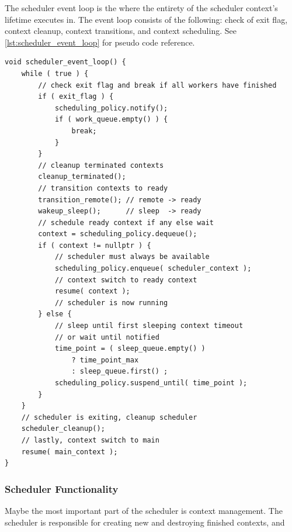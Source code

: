 The scheduler event loop is the where the entirety of the scheduler context's lifetime executes in. The event loop consists of the following: check of exit flag, context cleanup, context transitions, and context scheduling. See \cref{lst:scheduler_event_loop} for pseudo code reference.

\begin{lstfloat}
\begin{lstlisting}[caption={Scheduler event loop pseudo code.}, label={lst:scheduler_event_loop}, style={CustomC}, xleftmargin={4em}]
void scheduler_event_loop() {
    while ( true ) {
        // check exit flag and break if all workers have finished
        if ( exit_flag ) {
            scheduling_policy.notify();
            if ( work_queue.empty() ) {
                break;
            }
        }
        // cleanup terminated contexts
        cleanup_terminated();
        // transition contexts to ready
        transition_remote(); // remote -> ready
        wakeup_sleep();      // sleep  -> ready
        // schedule ready context if any else wait
        context = scheduling_policy.dequeue();
        if ( context != nullptr ) {
            // scheduler must always be available
            scheduling_policy.enqueue( scheduler_context );
            // context switch to ready context
            resume( context );
            // scheduler is now running
        } else {
            // sleep until first sleeping context timeout
            // or wait until notified
            time_point = ( sleep_queue.empty() )
                ? time_point_max
                : sleep_queue.first() ;
            scheduling_policy.suspend_until( time_point );
        }
    }
    // scheduler is exiting, cleanup scheduler
    scheduler_cleanup();
    // lastly, context switch to main
    resume( main_context );
}
\end{lstlisting}
\end{lstfloat}

\FloatBarrier
\subsubsection{Scheduler Functionality}

Maybe the most important part of the scheduler is context management. The scheduler is responsible for creating new and destroying finished contexts, and 



